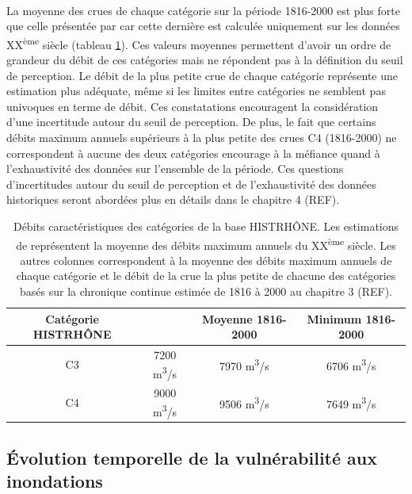 	\paragraph{} La moyenne des crues de chaque catégorie sur la période 1816-2000 est plus forte que celle présentée par \citet{pichard_hydro-climatology_2017} car cette dernière est calculée uniquement sur les données XX\textsuperscript{ème} siècle (tableau \ref{tab:Qcateg}). Ces valeurs moyennes permettent d'avoir un ordre de grandeur du débit de ces catégories mais ne répondent pas à la définition du seuil de perception. Le débit de la plus petite crue de chaque catégorie représente une estimation plus adéquate, même si les limites entre catégories ne semblent pas univoques en terme de débit. Ces constatations encouragent la considération d'une incertitude autour du seuil de perception. De plus, le fait que certains débits maximum annuels supérieurs à la plus petite des crues C4 (1816-2000) ne correspondent à aucune des deux catégories encourage à la méfiance quand à l'exhaustivité des données sur l'ensemble de la période. Ces questions d'incertitudes autour du seuil de perception et de l'exhaustivité des données historiques seront abordées plus en détails dans le chapitre 4 (REF).

	\begin{table}[h]
	\centering
	\caption{Débits caractéristiques des catégories de la base HISTRHÔNE. Les estimations de \citet{pichard_hydro-climatology_2017} représentent la moyenne des débits maximum annuels du XX\textsuperscript{ème} siècle. Les autres colonnes correspondent à la moyenne des débits maximum annuels de chaque catégorie et le débit de la crue la plus petite de chacune des catégories basés sur la chronique continue estimée de 1816 à 2000 au chapitre 3 (REF).} 
	\label{tab:Qcateg}
		\begin{tabular}{|c|c|c|c|}
		\hline
		Catégorie HISTRHÔNE & \citet{pichard_hydro-climatology_2017} & Moyenne 1816-2000 & Minimum 1816-2000\\ \hline
		C3  & 7200 m\textsuperscript{3}/s  & 7970 m\textsuperscript{3}/s    & 6706 m\textsuperscript{3}/s   \\ \hline
		C4  & 9000 m\textsuperscript{3}/s  & 9506 m\textsuperscript{3}/s    & 7649 m\textsuperscript{3}/s   \\ \hline
		\end{tabular}
	\end{table}
	
	\subsection{Évolution temporelle de la vulnérabilité aux inondations}
	\label{subsec:EvolVuln}
	
